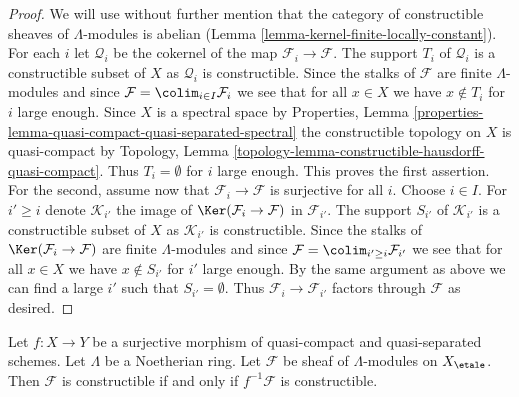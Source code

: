 \begin{proof}
We will use without further mention that the category of
constructible sheaves of $\Lambda$-modules is abelian
(Lemma \ref{lemma-kernel-finite-locally-constant}).
For each $i$ let $\mathcal{Q}_i$ be the cokernel of the map
$\mathcal{F}_i \to \mathcal{F}$. The support $T_i$ of $\mathcal{Q}_i$
is a constructible subset of $X$ as $\mathcal{Q}_i$ is constructible.
Since the stalks of $\mathcal{F}$ are finite $\Lambda$-modules
and since $\mathcal{F} = \colim_{i \in I} \mathcal{F}_i$ we see
that for all $x \in X$ we have $x \not \in T_i$ for $i$ large enough.
Since $X$ is a spectral space by Properties, Lemma
\ref{properties-lemma-quasi-compact-quasi-separated-spectral}
the constructible topology on $X$ is quasi-compact by
Topology, Lemma \ref{topology-lemma-constructible-hausdorff-quasi-compact}.
Thus $T_i = \emptyset$ for $i$ large enough. This proves the first
assertion. For the second, assume now that
$\mathcal{F}_i \to \mathcal{F}$ is surjective for all $i$.
Choose $i \in I$. For $i' \geq i$ denote $\mathcal{K}_{i'}$ the
image of $\Ker(\mathcal{F}_i \to \mathcal{F})$ in $\mathcal{F}_{i'}$.
The support $S_{i'}$ of $\mathcal{K}_{i'}$
is a constructible subset of $X$ as $\mathcal{K}_{i'}$ is constructible.
Since the stalks of $\Ker(\mathcal{F}_i \to \mathcal{F})$
are finite $\Lambda$-modules and since
$\mathcal{F} = \colim_{i' \geq i} \mathcal{F}_{i'}$ we see
that for all $x \in X$ we have $x \not \in S_{i'}$ for $i'$ large enough.
By the same argument as above we can find a large $i'$ such
that $S_{i'} = \emptyset$. Thus $\mathcal{F}_i \to \mathcal{F}_{i'}$
factors through $\mathcal{F}$ as desired.
\end{proof}

\begin{lemma}
\label{lemma-check-constructible}
Let $f : X \to Y$ be a surjective morphism of quasi-compact and
quasi-separated schemes. Let $\Lambda$ be a Noetherian ring.
Let $\mathcal{F}$ be sheaf of $\Lambda$-modules on $X_\etale$.
Then $\mathcal{F}$ is constructible if and only if $f^{-1}\mathcal{F}$
is constructible.
\end{lemma}

